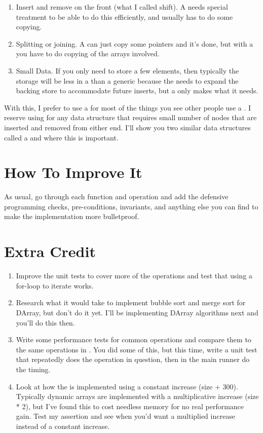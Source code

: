 \begin{enumerate}
\item Insert and remove on the front (what I called shift).  A  
    needs special treatment to be able to do this efficiently, and usually
    has to do some copying.
\item Splitting or joining.  A  can just copy some pointers and
    it's done, but with a  you have to do copying of the
    arrays involved.
\item Small Data. If you only need to store a few elements, then typically the
    storage will be less in a  than a generic  because
    the  needs to expand the backing store to accommodate future
    inserts, but a  only makes what it needs.
\end{enumerate}

With this, I prefer to use a  for most of the things you see
other people use a .  I reserve using  for any
data structure that requires small number of nodes that are inserted and
removed from either end.  I'll show you two similar data structures 
called a  and  where this is important.

\section{How To Improve It}

As usual, go through each function and operation and add the defensive programming
checks, pre-conditions, invariants, and anything else you can find to make the
implementation more bulletproof.

\section{Extra Credit}

\begin{enumerate}
\item Improve the unit tests to cover more of the operations and test that
    using a for-loop to iterate works.
\item Research what it would take to implement bubble sort and merge sort
    for DArray, but don't do it yet.  I'll be implementing DArray algorithms
    next and you'll do this then.
\item Write some performance tests for common operations and compare them
    to the same operations in .  You did some of this, but this
    time, write a unit test that repeatedly does the operation in question,
    then in the main runner do the timing.
\item Look at how the  is implemented using a constant increase (size + 300).
    Typically dynamic arrays are implemented with a multiplicative increase (size * 2), but I've
    found this to cost needless memory for no real performance gain.  Test my assertion
    and see when you'd want a multiplied increase instead of a constant increase.
\end{enumerate}


